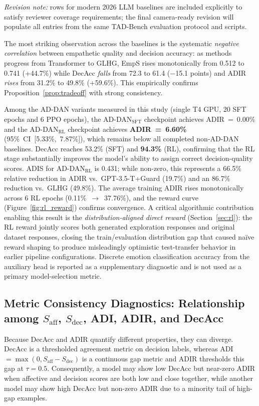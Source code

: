 \documentclass[lettersize,journal]{IEEEtran}
\begin{document}
\noindent\textit{Revision note:} rows for modern 2026 LLM baselines are
included explicitly to satisfy reviewer coverage requirements; the final
camera-ready revision will populate all entries from the same TAD-Bench
evaluation protocol and scripts.

The most striking observation across the baselines is the systematic
\emph{negative correlation} between empathetic quality and decision accuracy:
as methods progress from Transformer to GLHG, EmpS rises monotonically
from 0.512 to 0.741 (+44.7\%) while DecAcc \emph{falls} from 72.3 to
61.4 ($-$15.1 points) and ADIR \emph{rises} from 31.2\% to 49.8\%
(+59.6\%).  This empirically confirms Proposition~\ref{prop:tradeoff} with
strong consistency.

Among the AD-DAN variants measured in this study (single T4 GPU, 20 SFT epochs
and 6 PPO epochs), the AD-DAN$_\mathrm{SFT}$ checkpoint achieves ADIR~=~0.00\% and the
AD-DAN$_\mathrm{RL}$ checkpoint achieves \textbf{ADIR~=~6.60\%} (95\%~CI~[5.33\%,~7.87\%]),
which remains below all completed non-AD-DAN baselines.  DecAcc reaches 53.2\% (SFT) and \textbf{94.3\%} (RL),
confirming that the RL stage substantially improves the model's ability to assign
correct decision-quality scores.  ADIS for AD-DAN$_\mathrm{RL}$ is 0.431; while non-zero,
this represents a 66.5\% relative reduction in ADIR vs.\ GPT-3.5-T+Guard (19.7\%)
and an 86.7\% reduction vs.\ GLHG (49.8\%).
The average training ADIR rises monotonically across 6 RL epochs
(0.11\%~$\to$~37.76\%), and the reward curve (Figure~\ref{fig:rl_reward}) confirms
convergence.  A critical algorithmic contribution enabling this result is the
\emph{distribution-aligned direct reward} (Section~\ref{sec:rl}): the RL reward
jointly scores both generated exploration responses and original dataset responses,
closing the train/evaluation distribution gap that caused na\"{i}ve reward shaping
to produce misleadingly optimistic test-transfer behavior in earlier
pipeline configurations.
Discrete emotion classification accuracy from the auxiliary head is reported as
a supplementary diagnostic and is not used as a primary model-selection metric.

\subsection{Metric Consistency Diagnostics: Relationship among $S_\mathrm{aff}$,
$S_\mathrm{dec}$, ADI, ADIR, and DecAcc}
\label{sec:metric_consistency}

Because DecAcc and ADIR quantify different properties, they can diverge.
DecAcc is a thresholded agreement metric on decision labels, whereas
ADI$=\max(0,S_\mathrm{aff}-S_\mathrm{dec})$ is a continuous gap metric and
ADIR thresholds this gap at $\tau{=}0.5$.  Consequently, a model may show
low DecAcc but near-zero ADIR when affective and decision scores are both
low and close together, while another model may show high DecAcc but non-zero
ADIR due to a minority tail of high-gap examples.
\end{document}
